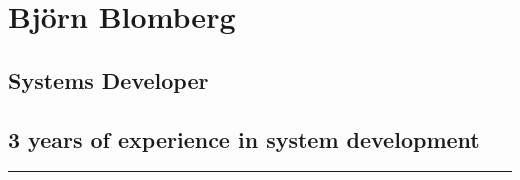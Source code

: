 \documentclass{article}
\begin{document}
	
	\begin{minipage}[t]{0.7\textwidth}
		\titleformat{\section}{\Huge\bfseries}{\thesection}{1em}{}
		\section*{\textcolor{colorBlue}{Björn Blomberg}}
		\subsection*{\textcolor{colorRed}{Systems Developer}}
		\subsection*{3 years of experience in system development}
		\rule{7.7cm}{0.4pt}
		\titleformat{\section}{\Large\bfseries}{\thesection}{1em}{}
		\vspace{1.5cm}
	\end{minipage}%
	\begin{minipage}[t]{0.3\textwidth}
		\vspace{-10pt} %
	\end{minipage}%
	
\end{document}

